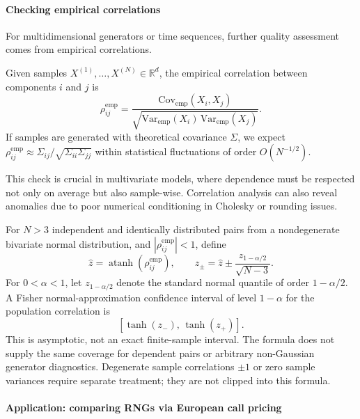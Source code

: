 \paragraph{Checking empirical correlations}

For multidimensional generators or time sequences, further quality assessment comes from empirical correlations.

\begin{definition}
Given samples \(X^{(1)}, \dots, X^{(N)} \in \mathbb{R}^d\), the empirical correlation between components \(i\) and \(j\) is
\[
\rho_{ij}^{\mathrm{emp}} = 
\frac{\mathrm{Cov}_{\mathrm{emp}}(X_i, X_j)}{\sqrt{\mathrm{Var}_{\mathrm{emp}}(X_i)\,\mathrm{Var}_{\mathrm{emp}}(X_j)}}.
\]
If samples are generated with theoretical covariance \(\Sigma\), 
we expect \(\rho_{ij}^{\mathrm{emp}} \approx \Sigma_{ij}/\sqrt{\Sigma_{ii}\Sigma_{jj}}\)
within statistical fluctuations of order \(O(N^{-1/2})\).
\end{definition}

\noindent
This check is crucial in multivariate models, 
where dependence must be respected not only on average but also sample-wise.
Correlation analysis can also reveal anomalies due to poor numerical conditioning in Cholesky or rounding issues.

\begin{remark}
For $N>3$ independent and identically distributed pairs from a nondegenerate bivariate normal
distribution, and $|\rho_{ij}^{\mathrm{emp}}|<1$, define
\[
\hat z=\operatorname{atanh}(\rho_{ij}^{\mathrm{emp}}),\qquad
z_\pm=\hat z\pm\frac{z_{1-\alpha/2}}{\sqrt{N-3}}.
\]
For $0<\alpha<1$, let $z_{1-\alpha/2}$ denote the standard normal
quantile of order $1-\alpha/2$. A Fisher normal-approximation
confidence interval of level $1-\alpha$ for the population correlation is
\[
[\tanh(z_-),\,\tanh(z_+)].
\]
This is asymptotic, not an exact finite-sample interval. The formula
does not supply the same coverage for dependent pairs or arbitrary
non-Gaussian generator diagnostics. Degenerate sample correlations
$\pm1$ or zero sample variances require separate treatment; they are not
clipped into this formula.
\end{remark}

\paragraph{Application: comparing RNGs via European call pricing}

